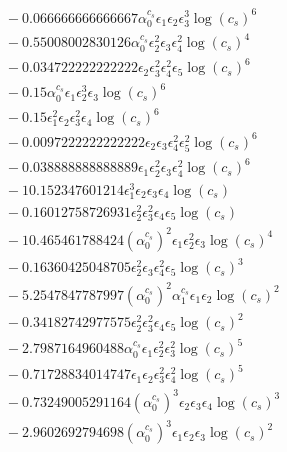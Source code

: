 \documentclass[10pt]{article}
\begin{document}
\begin{align*}
&{}  - 0.066666666666667 \alpha_{0}^{c_s} \epsilon_{1} \epsilon_{2} \epsilon_{3}^{3} \log{\left(c_{s} \right)}^{6} \\
&{}  - 0.55008002830126 \alpha_{0}^{c_s} \epsilon_{2}^{2} \epsilon_{3} \epsilon_{4}^{2} \log{\left(c_{s} \right)}^{4} \\
&{}  - 0.034722222222222 \epsilon_{2} \epsilon_{3}^{2} \epsilon_{4}^{2} \epsilon_{5} \log{\left(c_{s} \right)}^{6} \\
&{}  - 0.15 \alpha_{0}^{c_s} \epsilon_{1} \epsilon_{2}^{3} \epsilon_{3} \log{\left(c_{s} \right)}^{6} \\
&{}  - 0.15 \epsilon_{1}^{2} \epsilon_{2} \epsilon_{3}^{2} \epsilon_{4} \log{\left(c_{s} \right)}^{6} \\
&{}  - 0.0097222222222222 \epsilon_{2} \epsilon_{3} \epsilon_{4}^{2} \epsilon_{5}^{2} \log{\left(c_{s} \right)}^{6} \\
&{}  - 0.038888888888889 \epsilon_{1} \epsilon_{2}^{2} \epsilon_{3} \epsilon_{4}^{2} \log{\left(c_{s} \right)}^{6} \\
&{}  - 10.152347601214 \epsilon_{1}^{3} \epsilon_{2} \epsilon_{3} \epsilon_{4} \log{\left(c_{s} \right)} \\
&{}  - 0.16012758726931 \epsilon_{2}^{2} \epsilon_{3}^{2} \epsilon_{4} \epsilon_{5} \log{\left(c_{s} \right)} \\
&{}  - 10.465461788424 \left(\alpha_{0}^{c_s}\right)^{2} \epsilon_{1} \epsilon_{2}^{2} \epsilon_{3} \log{\left(c_{s} \right)}^{4} \\
&{}  - 0.16360425048705 \epsilon_{2}^{2} \epsilon_{3} \epsilon_{4}^{2} \epsilon_{5} \log{\left(c_{s} \right)}^{3} \\
&{}  - 5.2547847787997 \left(\alpha_{0}^{c_s}\right)^{2} \alpha_{1}^{c_s} \epsilon_{1} \epsilon_{2} \log{\left(c_{s} \right)}^{2} \\
&{}  - 0.34182742977575 \epsilon_{2}^{2} \epsilon_{3}^{2} \epsilon_{4} \epsilon_{5} \log{\left(c_{s} \right)}^{2} \\
&{}  - 2.7987164960488 \alpha_{0}^{c_s} \epsilon_{1} \epsilon_{2}^{2} \epsilon_{3}^{2} \log{\left(c_{s} \right)}^{5} \\
&{}  - 0.71728834014747 \epsilon_{1} \epsilon_{2} \epsilon_{3}^{2} \epsilon_{4}^{2} \log{\left(c_{s} \right)}^{5} \\
&{}  - 0.73249005291164 \left(\alpha_{0}^{c_s}\right)^{3} \epsilon_{2} \epsilon_{3} \epsilon_{4} \log{\left(c_{s} \right)}^{3} \\
&{}  - 2.9602692794698 \left(\alpha_{0}^{c_s}\right)^{3} \epsilon_{1} \epsilon_{2} \epsilon_{3} \log{\left(c_{s} \right)}^{2} \\

\end{align*}
\end{document}
